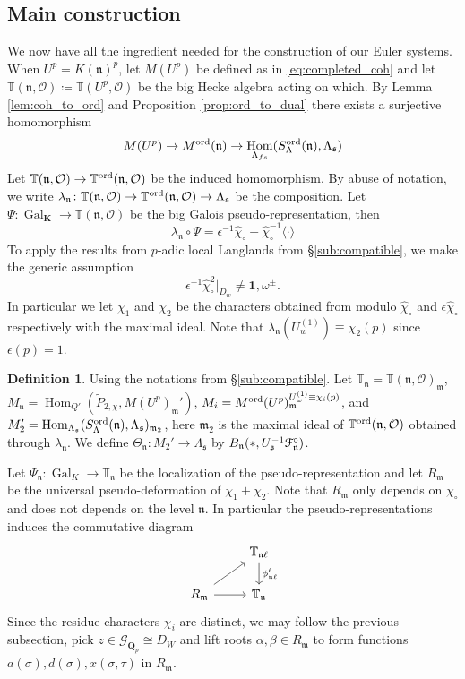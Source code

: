 \documentclass[leqno]{amsart}
\newcommand{\euF}{\EuScript{F}} %
\newcommand{\TT}{\mathbb{T}} %
\newcommand{\Gp}{\mathcal{G}_{\Qp}} %
\DeclareMathOperator{\Gal}{Gal}
\newcommand{\ord}{\textnormal{ord}}
\newcommand{\id}{\mathbf{1}}
\newcommand{\Qp}{\mathbf{Q}_p}
\newcommand{\K}{{\mathbf{K}}} %
\newcommand{\oo}{\mathcal{O}} %
\newcommand{\fs}{\mathfrak{s}}
\newcommand{\fm}{\mathfrak{m}}
\newcommand{\fn}{\mathfrak{n}}
\DeclareMathOperator{\Hom}{Hom}
\theoremstyle{definition}
\newtheorem{defn}[thm]{Definition}
\theoremstyle{remark}
\begin{document}
\subsection{Main construction}

We now have all the ingredient needed 
for the construction of our Euler systems.
When $U^p=K(\fn)^p$,
let $M(U^p)$ be defined as in \eqref{eq:completed_coh}
and let $\TT(\fn,\oo)\coloneqq \TT(U^p,\oo)$
be the big Hecke algebra acting on which.
By Lemma \ref{lem:coh_to_ord}
and Proposition \ref{prop:ord_to_dual}
there exists a surjective homomorphism
\[
	M(U^p)\to M^{\ord}(\fn)\to 
	\Hom_{\Lambda_{fs}}(S_\Lambda^{\ord}(\fn),\Lambda_\fs)
\]
Let $\TT(\fn,\oo)\to \TT^{\ord}(\fn,\oo)$
be the induced homomorphism.
By abuse of notation, we write 
$\lambda_{\fn}\colon \TT(\fn,\oo)\to \TT^{\ord}(\fn,\oo)\to
\Lambda_{\fs}$ be the composition.
Let $\Psi\colon \Gal_\K\to \TT(\fn,\oo)$ be the 
big Galois pseudo-representation, then
\[
	\lambda_{\fn}\circ \Psi=
	\epsilon^{-1}\hat{\chi}_\circ+
	\hat{\chi}_\circ^{-1}\langle\cdot\rangle
\]
To apply the results from $p$-adic local Langlands
from \S\ref{sub:compatible},
we make the generic assumption
\begin{equation}\label{cond:chi_gen}\tag{$\chi$-gen}
\epsilon^{-1}\hat{\chi}_\circ^{2}\vert_{D_w}\neq
\id, \omega^{\pm}.
\end{equation}
In particular we let 
$\chi_1$ and  $\chi_2$ be the 
characters obtained from 
modulo 
$\hat{\chi}_\circ$ and $\epsilon\hat{\chi}_\circ$ 
respectively with the maximal ideal.
Note that $\lambda_{\fn}(U_{w}^{(1)})\equiv \chi_2(p)$
since $\epsilon(p)=1$.


\begin{defn}
	Using the notations from 
	\S\ref{sub:compatible}.
	Let $\TT_\fn=\TT(\fn,\oo)_\fm$,
	$M_\fn=\Hom_{Q'}(\tilde{P}_{2,\chi},M(U^p)_{\fm}')$,
	$M_i=M^{\ord}(U^p)_\fm^{U_{w}^{(1)}\equiv\chi_i(p)}$,
	and $M_2'=\Hom_{\Lambda_{\fs}}
	(S^{\ord}_{\Lambda}(\fn),\Lambda_{\fs})_{\fm_2}$,
	here $\fm_2$ is the maximal ideal
	of $\TT^{\ord}(\fn,\oo)$ obtained through 
	$\lambda_\fn$.
	We define 
	$\Theta_\fn\colon M_2'\to \Lambda_{\fs}$
	by $B_\fn(*,U_\fs^{-1}\euF^\circ_\fn)$.
\end{defn}


Let $\Psi_{\fn}\colon \Gal_K\to \TT_\fn$ be the localization
of the pseudo-representation
and let $R_{\fm}$ be the universal 
pseudo-deformation of $\chi_1+\chi_2$.
Note that  $R_\fm$ only depends on  $\chi_\circ$
and does not depends on the level  $\fn$.
In particular the pseudo-representations induces
the commutative diagram
\[
\begin{tikzcd}
	& \TT_{\fn\ell}\arrow[d,"\phi_{\fn\ell}^\ell"]\\
	R_{\fm}\arrow[r]\arrow[ur]
	& \TT_{\fn}
\end{tikzcd}
\]
Since the residue characters $\chi_i$ are distinct,
we may follow the previous subsection,
pick  $z\in \Gp\cong D_W$ 
and lift roots $\alpha,\beta\in R_\fm$
to form functions  $a(\sigma), d(\sigma), x(\sigma,\tau)$
in  $R_\fm$.
\end{document}
